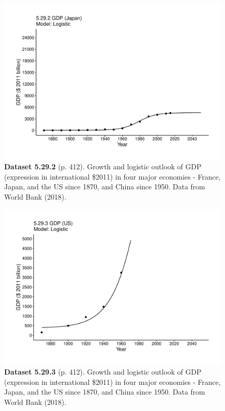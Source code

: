 \documentclass[aps,rmp,preprint,superscriptaddress,10pt,onecolumn]{article}
\begin{document}
\clearpage
\begin{figure}[h]
\includegraphics[width=\textwidth]{output/figs-ggplot/5.29.2.pdf}
\caption*{\textbf{Dataset 5.29.2} (p. 412). Growth and logistic outlook of GDP (expression in international \$2011) in four major economies - France, Japan, and the US since 1870, and China since 1950. Data from World Bank (2018).}
\end{figure}
	
\clearpage
\begin{figure}[h]
\includegraphics[width=\textwidth]{output/figs-ggplot/5.29.3.pdf}
\caption*{\textbf{Dataset 5.29.3} (p. 412). Growth and logistic outlook of GDP (expression in international \$2011) in four major economies - France, Japan, and the US since 1870, and China since 1950. Data from World Bank (2018).}
\end{figure}
	
\end{document}
